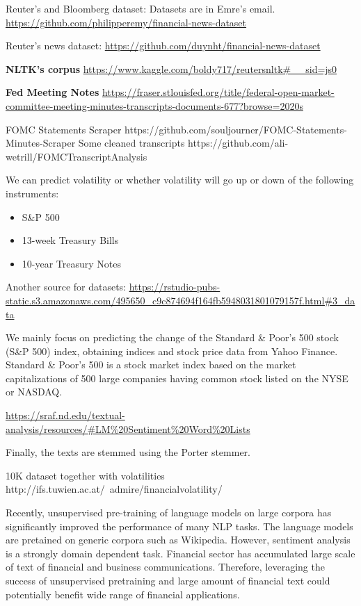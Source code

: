 \documentclass[11pt]{article}
\begin{document}
Reuter's and Bloomberg dataset: Datasets are in Emre's email.
\url{https://github.com/philipperemy/financial-news-dataset}

Reuter's news dataset:
\url{https://github.com/duynht/financial-news-dataset}


\textbf{NLTK's corpus}
\url{https://www.kaggle.com/boldy717/reutersnltk#__sid=js0}


\textbf{Fed Meeting Notes}
\url{https://fraser.stlouisfed.org/title/federal-open-market-committee-meeting-minutes-transcripts-documents-677?browse=2020s}

FOMC Statements Scraper
https://github.com/souljourner/FOMC-Statements-Minutes-Scraper
Some cleaned transcripts
https://github.com/ali-wetrill/FOMCTranscriptAnalysis

We can predict volatility or whether volatility will go up or down of the following instruments:
\begin{itemize}
\item S\&P 500
\item 13-week Treasury Bills
\item 10-year Treasury Notes
\end{itemize}

Another source for datasets: \url{https://rstudio-pubs-static.s3.amazonaws.com/495650_c9c874694f164fb5948031801079157f.html#3_data}


We mainly focus on predicting the change of the Standard \& Poor’s 500 stock (S\&P 500) index,
obtaining indices and stock price data from Yahoo Finance. Standard \& Poor’s 500 is a stock market index based
on the market capitalizations of 500 large companies having common stock listed on the NYSE or NASDAQ.


\url{https://sraf.nd.edu/textual-analysis/resources/#LM%20Sentiment%20Word%20Lists}

Finally,
the texts are stemmed using the Porter stemmer.


10K dataset together with volatilities
http://ifs.tuwien.ac.at/~admire/financialvolatility/




Recently, unsupervised pre-training of language models on large corpora has significantly improved the performance of many NLP tasks. The
language models are pretained on generic corpora such as Wikipedia. However, sentiment analysis
is a strongly domain dependent task. Financial sector has accumulated large scale of text of financial and business communications. Therefore,
leveraging the success of unsupervised pretraining and large amount of
financial text could potentially benefit wide range of financial applications.
\end{document}
